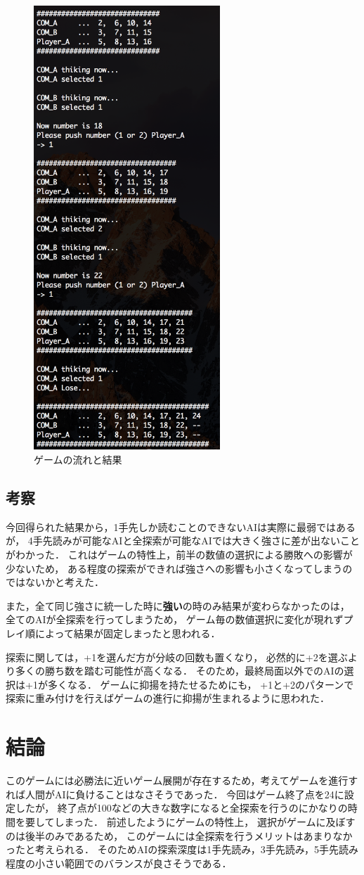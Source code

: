 \documentclass[a4paper,10pt]{jsarticle}
\begin{document}
\begin{figure}[htbp]
\begin{minipage}{0.5\hsize}
    \includegraphics[width=70mm]{./image/GameResult.png}
    \caption{ゲームの流れと結果}
    \label{fig:GameResult}
  \end{minipage}
\end{figure}
\subsection{考察}
今回得られた結果から，1手先しか読むことのできないAIは実際に最弱ではあるが，
4手先読みが可能なAIと全探索が可能なAIでは大きく強さに差が出ないことがわかった．
これはゲームの特性上，前半の数値の選択による勝敗への影響が少ないため，
ある程度の探索ができれば強さへの影響も小さくなってしまうのではないかと考えた．\par
また，全て同じ強さに統一した時に\textbf{強い}の時のみ結果が変わらなかったのは，
全てのAIが全探索を行ってしまうため，
ゲーム毎の数値選択に変化が現れずプレイ順によって結果が固定しまったと思われる．\par
探索に関しては，+1を選んだ方が分岐の回数も置くなり，
必然的に+2を選ぶより多くの勝ち数を踏む可能性が高くなる．
そのため，最終局面以外でのAIの選択は+1が多くなる．
ゲームに抑揚を持たせるためにも，
+1と+2のパターンで探索に重み付けを行えばゲームの進行に抑揚が生まれるように思われた．

\section{結論}
このゲームには必勝法に近いゲーム展開が存在するため，考えてゲームを進行すれば人間がAIに負けることはなさそうであった．
今回はゲーム終了点を24に設定したが，
終了点が100などの大きな数字になると全探索を行うのにかなりの時間を要してしまった．
前述したようにゲームの特性上，
選択がゲームに及ぼすのは後半のみであるため，
このゲームには全探索を行うメリットはあまりなかったと考えられる．
そのためAIの探索深度は1手先読み，3手先読み，5手先読み程度の小さい範囲でのバランスが良さそうである．
\end{document}
